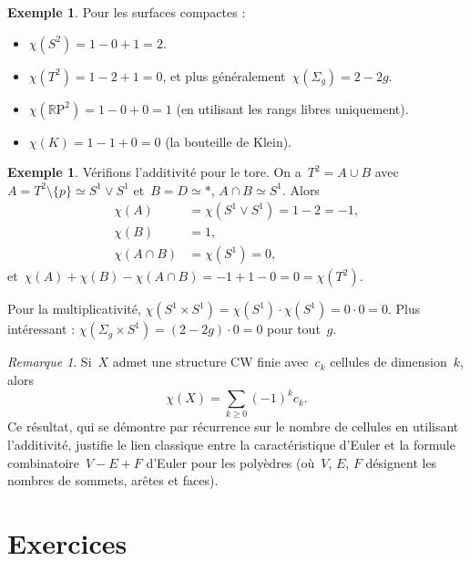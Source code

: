\documentclass[12pt,a4paper,openany]{book}
\theoremstyle{definition}
\newtheorem{exemple}[definition]{Exemple}
\theoremstyle{plain}
\theoremstyle{remark}
\newtheorem{remarque}[definition]{Remarque}
\newcommand{\RP}{\mathbb{R}\mathrm{P}}
\begin{document}
\begin{exemple}\label{ex:euler-surfaces}
Pour les surfaces compactes :
\begin{itemize}
  \item $\chi(S^2) = 1 - 0 + 1 = 2$.
  \item $\chi(T^2) = 1 - 2 + 1 = 0$, et plus généralement~$\chi(\Sigma_g) = 2 - 2g$.
  \item $\chi(\RP^2) = 1 - 0 + 0 = 1$ (en utilisant les rangs libres uniquement).
  \item $\chi(K) = 1 - 1 + 0 = 0$ (la bouteille de Klein).
\end{itemize}
\end{exemple}

\begin{exemple}\label{ex:euler-verification}
Vérifions l'additivité pour le tore. On a~$T^2 = A \cup B$ avec~$A = T^2 \setminus \{p\}
\simeq S^1 \vee S^1$ et~$B = D \simeq \ast$, $A \cap B \simeq S^1$. Alors
\begin{align*}
  \chi(A) &= \chi(S^1 \vee S^1) = 1 - 2 = -1,\\
  \chi(B) &= 1,\\
  \chi(A \cap B) &= \chi(S^1) = 0,
\end{align*}
et~$\chi(A) + \chi(B) - \chi(A \cap B) = -1 + 1 - 0 = 0 = \chi(T^2)$.

Pour la multiplicativité, $\chi(S^1 \times S^1) = \chi(S^1) \cdot \chi(S^1) = 0 \cdot 0 = 0$.
Plus intéressant : $\chi(\Sigma_g \times S^1) = (2-2g) \cdot 0 = 0$ pour tout~$g$.
\end{exemple}

\begin{remarque}\label{rem:euler-cellulaire}
Si~$X$ admet une structure CW finie avec~$c_k$ cellules de dimension~$k$, alors
\[
  \chi(X) = \sum_{k \geqslant 0} (-1)^k c_k.
\]
Ce résultat, qui se démontre par récurrence sur le nombre de cellules en utilisant
l'additivité, justifie le lien classique entre la caractéristique d'Euler et la formule
combinatoire~$V - E + F$ d'Euler pour les polyèdres
(où~$V$, $E$, $F$ désignent les nombres de sommets, arêtes et faces).
\end{remarque}

\section{Exercices}\label{sec:mv-exercices}
\end{document}
